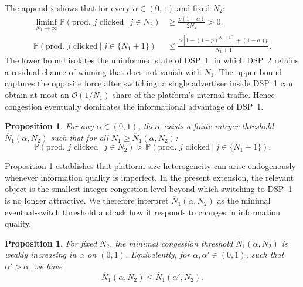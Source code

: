 \documentclass[11pt]{article}
\theoremstyle{plain}
\theoremstyle{definition}
\theoremstyle{plain}
\theoremstyle{plain}
\theoremstyle{plain}
\theoremstyle{plain}
\newtheorem{prop}[thm]{Proposition}
\numberwithin{equation}{section}
\begin{document}
\vspace{2mm}

\noindent The appendix shows that for every $\alpha \in (0,1)$ and fixed $N_2$:
\begin{align*}
    \liminf_{N_1 \to \infty} \mathbb{P}(\text{prod. } j \text{ clicked} \ | \ j \in N_2 ) & \geq \frac{p(1-\alpha)}{2N_2} > 0, \\[5pt]
    \mathbb{P}(\text{prod. } j \text{ clicked} \ | \ j \in \{N_{1}+1\} ) & \leq \frac{\alpha\left[1-(1-p)^{N_1+1}\right] + (1-\alpha)p}{N_1+1}.
\end{align*}
The lower bound isolates the uninformed state of DSP~1, in which DSP~2 retains a residual chance of winning that does not vanish with $N_1$. The upper bound captures the opposite force after switching: a single advertiser inside DSP~1 can obtain at most an $\mathcal{O}(1/N_1)$ share of the platform's internal traffic. Hence congestion eventually dominates the informational advantage of DSP~1.

\vspace{0.2cm}

\begin{prop}\label{prop:congestion_info}
For any $\alpha \in (0,1)$, there exists a finite integer threshold $\overline{N}_1(\alpha, N_2)$ such that for all $N_1 \geq \overline{N}_1(\alpha, N_2)$:
\begin{equation*}
    \mathbb{P}(\text{prod. } j \text{ clicked} \ | \ j \in N_2 ) > \mathbb{P}(\text{prod. } j \text{ clicked} \ | \ j \in \{N_{1}+1\} ).
\end{equation*}
\end{prop}

\noindent Proposition \ref{prop:congestion_info} establishes that platform size heterogeneity can arise endogenously whenever information quality is imperfect. In the present extension, the relevant object is the smallest integer congestion level beyond which switching to DSP~1 is no longer attractive. We therefore interpret $\overline{N}_1(\alpha, N_2)$ as the minimal eventual-switch threshold and ask how it responds to changes in information quality.

\vspace{0.2cm}

\begin{prop}\label{prop:threshold_monotone}
For fixed $N_2$, the minimal congestion threshold $\overline{N}_1(\alpha, N_2)$ is weakly increasing in $\alpha$ on $(0,1)$. Equivalently, for $\alpha, \alpha ' \in (0,1)$, such that $\alpha'> \alpha$, we have
\begin{equation*}
    \overline{N}_1(\alpha, N_2) \leq \overline{N}_1(\alpha', N_2).
\end{equation*}
\end{prop}
\end{document}

